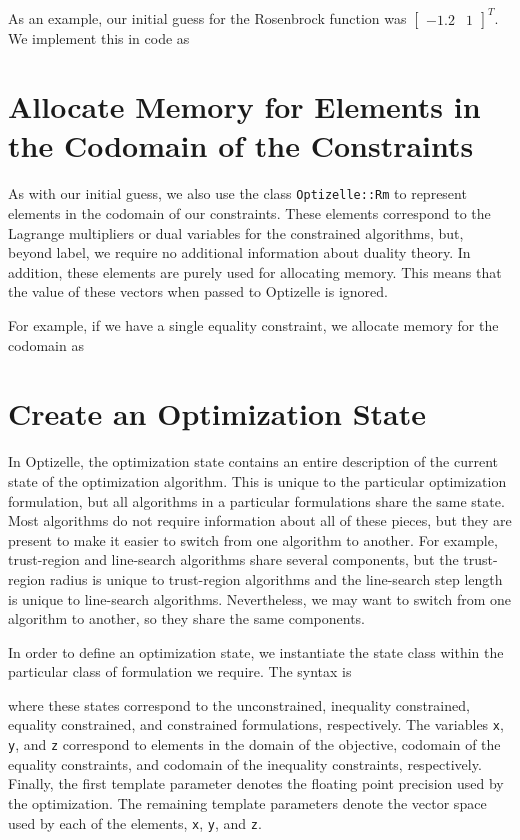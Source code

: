 \documentclass{report}
\begin{document}
        As an example, our initial guess for the Rosenbrock function was $\begin{bmatrix}-1.2 & 1\end{bmatrix}^T$.  We implement this in code as


\section{Allocate Memory for Elements in the Codomain of the Constraints}

        As with our initial guess, we also use the class \texttt{Optizelle::Rm} to represent elements in the codomain of our constraints.  These elements correspond to the Lagrange multipliers or dual variables for the constrained algorithms, but, beyond label, we require no additional information about duality theory.  In addition, these elements are purely used for allocating memory.  This means that the value of these vectors when passed to Optizelle is ignored.

        For example, if we have a single equality constraint, we allocate memory for the codomain as


\section{Create an Optimization State}\label{sec:State}

        In Optizelle, the optimization state contains an entire description of the current state of the optimization algorithm.  This is unique to the particular optimization formulation, but all algorithms in a particular formulations share the same state.  Most algorithms do not require information about all of these pieces, but they are present to make it easier to switch from one algorithm to another.  For example, trust-region and line-search algorithms share several components, but the trust-region radius is unique to trust-region algorithms and the line-search step length is unique to line-search algorithms.  Nevertheless, we may want to switch from one algorithm to another, so they share the same components.

        In order to define an optimization state, we instantiate the state class within the particular class of formulation we require.  The syntax is

where these states correspond to the unconstrained, inequality constrained, equality constrained, and constrained formulations, respectively.  The variables \texttt{x}, \texttt{y}, and \texttt{z} correspond to elements in the domain of the objective, codomain of the equality constraints, and codomain of the inequality constraints, respectively.  Finally, the first template parameter denotes the floating point precision used by the optimization.  The remaining template parameters denote the vector space used by each of the elements, \texttt{x}, \texttt{y}, and \texttt{z}. 
\end{document}
